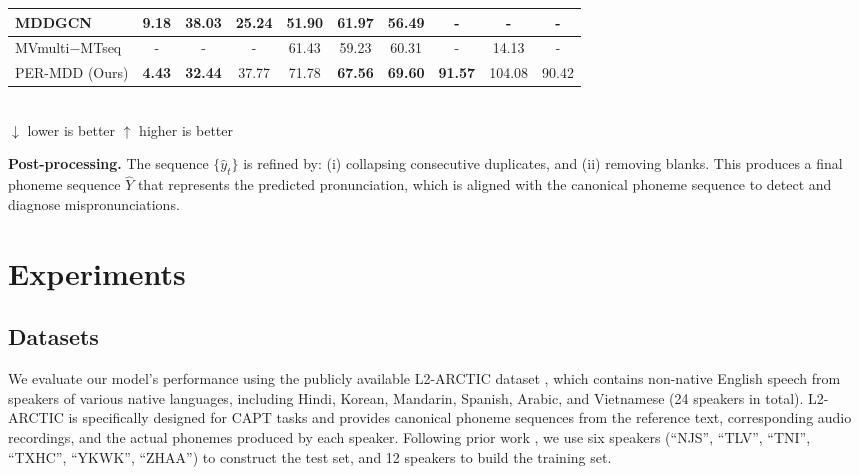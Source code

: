 \documentclass{article}
\begin{document}
\begin{table}
{\begin{tabular}{|l|ccccccc|cc|}
MDDGCN \cite{gcnmdd}                         & \multicolumn{1}{c|}{9.18}                     & \multicolumn{1}{c|}{38.03}                    & \multicolumn{1}{c|}{25.24}                    & \multicolumn{1}{c|}{51.90}                  & \multicolumn{1}{c|}{61.97}                  & \multicolumn{1}{c|}{56.49}                 & -                     & \multicolumn{1}{c|}{-}                        & -            \\ \hline
MVmulti−MTseq \cite{multiview}                   & \multicolumn{1}{c|}{-}                        & \multicolumn{1}{c|}{-}                        & \multicolumn{1}{c|}{-}                        & \multicolumn{1}{c|}{61.43}                  & \multicolumn{1}{c|}{59.23}                  & \multicolumn{1}{c|}{60.31}                 & -                     & \multicolumn{1}{c|}{14.13}                    & -            \\ \hline
PER-MDD (Ours)                  & \multicolumn{1}{c|}{\textbf{4.43}}            & \multicolumn{1}{c|}{\textbf{32.44}}           & \multicolumn{1}{c|}{37.77}                    & \multicolumn{1}{c|}{71.78}                  & \multicolumn{1}{c|}{\textbf{67.56}}         & \multicolumn{1}{c|}{\textbf{69.60}}        & \textbf{91.57}        & \multicolumn{1}{c|}{104.08}                   & 90.42        \\ \hline
\end{tabular}
}
\label{main-result}
\\
\centering
{\small $\downarrow$ lower is better}
{\small $\uparrow$ higher is better}
\end{table}

\noindent\textbf{Post-processing.}  
The sequence $\{\hat{y}_t\}$ is refined by:  
(i) collapsing consecutive duplicates, and  
(ii) removing blanks.  
This produces a final phoneme sequence $\hat{Y}$ that represents the predicted pronunciation, which is aligned with the canonical phoneme sequence to detect and diagnose mispronunciations.

\section{Experiments}


\subsection{Datasets}

We evaluate our model's performance using the publicly available L2-ARCTIC dataset \cite{L2arctic}, which contains non-native English speech from speakers of various native languages, including Hindi, Korean, Mandarin, Spanish, Arabic, and Vietnamese (24 speakers in total). L2-ARCTIC is specifically designed for CAPT tasks and provides canonical phoneme sequences from the reference text, corresponding audio recordings, and the actual phonemes produced by each speaker. Following prior work \cite{AFullText-Dependent, sed-mdd, joint-align}, we use six speakers (“NJS”, “TLV”, “TNI”, “TXHC”, “YKWK”, “ZHAA”) to construct the test set, and 12 speakers to build the training set.
\end{document}
